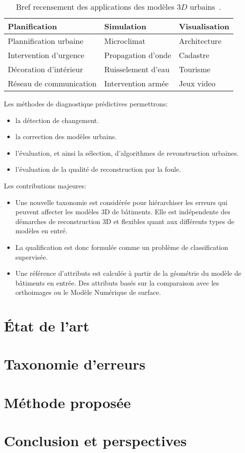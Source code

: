 \documentclass[a4paper,french]{article}
\begin{document}
    \begin{table}[h!]
        \begin{center}
            \begin{tabular}{l l l}
                \toprule
                Planification & Simulation & Visualisation \\
                \midrule
                Plannification urbaine & Microclimat & Architecture \\
                Intervention d'urgence & Propagation d'onde
 & Cadastre \\
                Décoration d'intérieur & Ruisselement d'eau & Tourisme \\
                Réseau de communication & Intervention armée & Jeux video \\
                \bottomrule
            \end{tabular}
            \caption{\label{tab::3d_applications} Bref recensement des applications des modèles $3D$ urbains~\cite{Biljecki2015, Scholze2002}.}
        \end{center}
    \end{table}

    Les méthodes de diagnostique prédictives permettrons:
    \begin{itemize}
        \item la détection de changement.
        \item la correction des modèles urbains.
        \item l'évaluation, et ainsi la sélection, d'algorithmes de revonstruction urbaines.
        \item l'évaluation de la qualité de reconstruction par la foule.
    \end{itemize}

    Les contributions majeures:
    \begin{itemize}
        \item Une nouvelle taxonomie est considérée pour hiérarchiser les erreurs qui peuvent affecter les modèles 3D de bâtiments. Elle est indépendente des démarches de reconstruction 3D et flexibles quant aux différents types de modèles en entré.
        \item La qualification est donc formulée comme un problème de classification supervisée.
        \item Une référence d'attributs est calculée à partir de la géométrie du modèle de bâtiments en entrée. Des attributs basés sur la comparaison avec les orthoimages ou le Modèle Numérique de surface.
    \end{itemize}
    \section{\'Etat de l'art}
    \section{Taxonomie d'erreurs}
    \section{Méthode proposée}
    \section{Conclusion et perspectives}

    
    
\end{document}
